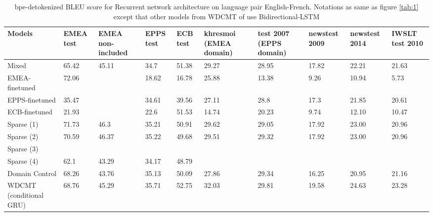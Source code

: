 \documentclass[11pt,a4paper]{article}
\begin{document}
\begin{table}
\begin{center}
 \begin{tabularx}{\textwidth}{|| X | X | X | X | X | X | X | X | X | X ||} 
 \hline
 Models & EMEA test & EMEA non-included & EPPS test & ECB test & khresmoi (EMEA domain) & test 2007 (EPPS domain) & newstest 2009 & newstest 2014 & IWSLT test 2010 \\ [0.5ex] 
 \hline\hline
 Mixed & 65.42 & 45.11 & 34.7 & 51.38 & 29.27 & 28.95 & 17.82 & 22.21 & 21.63 \\
 \hline
 EMEA-finetuned  & 72.06 & & 18.62 & 16.78 & 25.88 & 13.38 & 9.26 & 10.94 & 5.73 \\
 \hline
 EPPS-finetuned & 35.47 & & 34.61 & 39.56 & 27.11 & 28.8 & 17.3 & 21.85 & 20.61 \\
 \hline
 ECB-finetuned & 21.93 & & 22.6 & 51.53 & 14.74 & 20.23 & 9.74 & 12.10 & 10.47 \\
 \hline
 Sparse (1) & 71.73 & 46.3 & 35.21 & 50.91 & 29.62 & 29.05 & 17.92 & 23.00 & 20.96 \\
 \hline
 Sparse (2) & 70.59 & 46.37 & 35.22 & 49.68 & 29.51 & 29.32 & 17.92 & 23.00 & 20.96 \\
 \hline
 Sparse (3) &  &  &  &  & &  &  &  & \\
 \hline
 Sparse (4) & 62.1 & 43.29 & 34.17 & 48.79 &  &  &  &  & \\
 \hline
 Domain Control & 68.26 & 43.76 & 35.13 & 50.09 & 27.86 & 29.34 & 16.25 & 20.95 & 21.16 \\
 \hline
 WDCMT (conditional GRU) & 68.76 & 45.29 & 35.71 & 52.75 & 32.03 & 29.81 & 19.58 & 24.63 & 23.28 \\
 \hline 
\end{tabularx}
\end{center}
\caption{bpe-detokenized BLEU score for Recurrent network architecture on language pair English-French. Notations as same as figure \ref{tab:1} except that other models from WDCMT of \cite{Zeng18multidomain} use Bidirectional-LSTM}
\label{tab:3}
\end{table}
\end{document}
